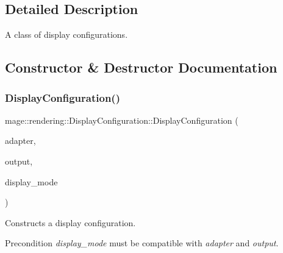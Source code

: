 \subsection{Detailed Description}
A class of display configurations. 

\subsection{Constructor \& Destructor Documentation}
\hypertarget{classmage_1_1rendering_1_1_display_configuration_ac0ee7768a59ee6a257405faaa942580b}{}\label{classmage_1_1rendering_1_1_display_configuration_ac0ee7768a59ee6a257405faaa942580b} 
\subsubsection{\texorpdfstring{Display\+Configuration()}{DisplayConfiguration()}\hspace{0.1cm}{\footnotesize\ttfamily [1/3]}}
{\footnotesize\ttfamily mage\+::rendering\+::\+Display\+Configuration\+::\+Display\+Configuration (\begin{DoxyParamCaption}\item[{\hyperlink{namespacemage_ae74f374780900893caa5555d1031fd79}{Com\+Ptr}$<$ \hyperlink{namespacemage_1_1rendering_ad55e028ebd705b547eeb972ad8d03b6a}{D\+X\+G\+I\+Adapter} $>$}]{adapter,  }\item[{\hyperlink{namespacemage_ae74f374780900893caa5555d1031fd79}{Com\+Ptr}$<$ \hyperlink{namespacemage_1_1rendering_aaf22d3893277a4bd8497f6ea69b01532}{D\+X\+G\+I\+Output} $>$}]{output,  }\item[{const D\+X\+G\+I\+\_\+\+M\+O\+D\+E\+\_\+\+D\+E\+SC \&}]{display\+\_\+mode }\end{DoxyParamCaption})\hspace{0.3cm}{\ttfamily [explicit]}}

Constructs a display configuration.

\begin{DoxyPrecond}{Precondition}
{\itshape display\+\_\+mode} must be compatible with {\itshape adapter} and {\itshape output}. 
\end{DoxyPrecond}


